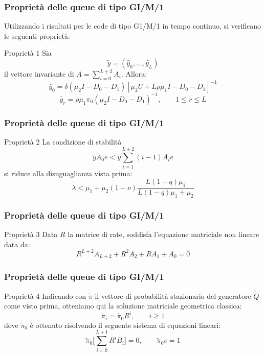 \documentclass{beamer}
\begin{document}
\begin{frame}
    \frametitle{Proprietà delle queue di tipo GI/M/1}
    Utilizzando i risultati per le code di tipo G1/M/1 in tempo continuo, si verificano le seguenti proprietà:
    \begin{block}{Proprietà 1}
        Sia
        $$\widetilde{y} = (\widetilde{y_0}, \dots, \widetilde{y_{L}})$$
        il vettore invariante di $\displaystyle A = \sum_{i=0}^{L+2} A_i$. Allora:
            $$ \widetilde{y_0} = \delta(\mu_2I - D_0 - D_1)[\mu_2U + L\rho\mu_1 I - D_0 - D_1]^{-1} $$
            $$ \widetilde{y_r} = \rho \mu_1 \pi_0(\mu_2I - D_0 - D_1)^{-1}, \qquad 1 \leq r \leq L $$
    \end{block}
\end{frame}


\begin{frame}
    \frametitle{Proprietà delle queue di tipo GI/M/1}
    \begin{block}{Proprietà 2}
        La condizione di stabilità
        $$ \widetilde{y} A_0 e < \widetilde{y} \sum_{i=1}^{L+2}(i-1)A_i e $$
        si riduce alla disuguaglianza vista prima:
        $$ \lambda < \mu_1 + \mu_2(1 - \nu) \frac{L(1-q)\mu_1}{L(1-q)\mu_1 + \mu_2}  $$
    \end{block}
\end{frame}


\begin{frame}
    \frametitle{Proprietà delle queue di tipo GI/M/1}
    \begin{block}{Proprietà 3}
        Data $R$ la matrice di rate, soddisfa l'equazione matriciale non lineare data da:
        $$ R^{L+2} A_{L+2} + R^2A_2 + RA_1 + A_0 = 0 $$
    \end{block}
\end{frame}


\begin{frame}
    \frametitle{Proprietà delle queue di tipo GI/M/1}
    \begin{block}{Proprietà 4}
        Indicando con $\widetilde{\pi}$ il vettore di probabilità stazionario del generatore $\widetilde{Q}$ come visto prima, otteniamo qui la soluzione matriciale geometrica classica:
        $$ \widetilde{\pi}_i = \widetilde{\pi}_0R^i, \qquad i \geq 1 $$
        dove $\widetilde{\pi}_0$ è ottenuto risolvendo il seguente sistema di equazioni lineari:
        $$ \widetilde{\pi}_0\Bigg[ \sum_{i=0}^{L+1} R^iB_i \Bigg] = 0, \qquad \widetilde{\pi}_0e = 1 $$
    \end{block}
\end{frame}
\end{document}
